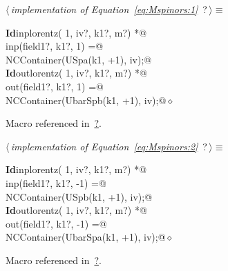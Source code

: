 \documentclass[a4paper,12pt]{amsart}
\renewcommand{\NWtarget}[2]{\hypertarget{#1}{#2}}
\renewcommand{\NWlink}[2]{\hyperlink{#1}{#2}}
\renewcommand{\NWtxtMacroRefIn}{Macro referenced in}
\renewcommand{\NWsep}{${\diamond}$}
\begin{document}
\begin{flushleft} \small
\begin{minipage}{\linewidth}\label{scrap14}\raggedright\small
\NWtarget{nuweb?}{} $\langle\,${\it implementation of Equation~\eqref{eq:Mspinors:1}}\nobreak\ {\footnotesize {?}}$\,\rangle\equiv$
\vspace{-1ex}
\begin{list}{}{} \item
\mbox{}\verb@@\hbox{\sffamily\bfseries Id}\verb@ inplorentz( 1, iv?, k1?, m?) *@\\
\mbox{}\verb@      inp(field1?, k1?,  1) =@\\
\mbox{}\verb@   NCContainer(USpa(k1, +1), iv);@\\
\mbox{}\verb@@\hbox{\sffamily\bfseries Id}\verb@ outlorentz( 1, iv?, k1?, m?) *@\\
\mbox{}\verb@      out(field1?, k1?,  1) =@\\
\mbox{}\verb@   NCContainer(UbarSpb(k1, +1), iv);@{\NWsep}
\end{list}
\vspace{-1.5ex}
\footnotesize
\begin{list}{}{\setlength{\itemsep}{-\parsep}\setlength{\itemindent}{-\leftmargin}}
\item \NWtxtMacroRefIn\ \NWlink{nuweb?}{?}.

\item{}
\end{list}
\end{minipage}\vspace{4ex}
\end{flushleft}
\begin{flushleft} \small
\begin{minipage}{\linewidth}\label{scrap15}\raggedright\small
\NWtarget{nuweb?}{} $\langle\,${\it implementation of Equation~\eqref{eq:Mspinors:2}}\nobreak\ {\footnotesize {?}}$\,\rangle\equiv$
\vspace{-1ex}
\begin{list}{}{} \item
\mbox{}\verb@@\hbox{\sffamily\bfseries Id}\verb@ inplorentz( 1, iv?, k1?, m?) *@\\
\mbox{}\verb@      inp(field1?, k1?, -1) =@\\
\mbox{}\verb@   NCContainer(USpb(k1, +1), iv);@\\
\mbox{}\verb@@\hbox{\sffamily\bfseries Id}\verb@ outlorentz( 1, iv?, k1?, m?) *@\\
\mbox{}\verb@      out(field1?, k1?, -1) =@\\
\mbox{}\verb@   NCContainer(UbarSpa(k1, +1), iv);@{\NWsep}
\end{list}
\vspace{-1.5ex}
\footnotesize
\begin{list}{}{\setlength{\itemsep}{-\parsep}\setlength{\itemindent}{-\leftmargin}}
\item \NWtxtMacroRefIn\ \NWlink{nuweb?}{?}.

\item{}
\end{list}
\end{minipage}\vspace{4ex}
\end{flushleft}
\end{document}

